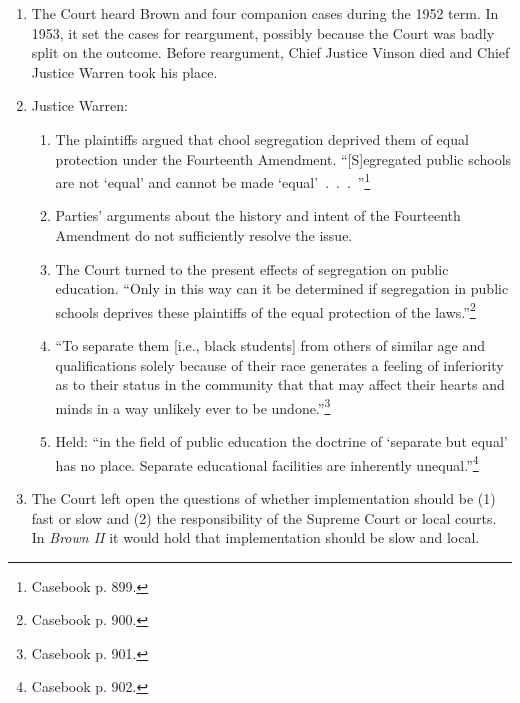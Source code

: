\begin{enumerate}
    \item The Court heard Brown and four companion cases during the 1952 term. 
    In 1953, it set the cases for reargument, possibly because the Court was 
    badly split on the outcome. Before reargument, Chief Justice Vinson died 
    and Chief Justice Warren took his place.
    \item Justice Warren:
    \begin{enumerate}
        \item The plaintiffs argued that chool segregation deprived them of 
        equal protection under the Fourteenth Amendment. ``[S]egregated public
        schools are not `equal' and cannot be made 
        `equal'~.~.~.~''\footnote{Casebook p. 899.}
        \item Parties' arguments about the history and intent of the 
        Fourteenth Amendment do not sufficiently resolve the issue.
        \item The Court turned to the present effects of segregation on public 
        education. ``Only in this way can it be determined if segregation in 
        public schools deprives these plaintiffs of the equal protection of 
        the laws.''\footnote{Casebook p. 900.}
        \item ``To separate them [i.e., black students] from others of similar 
        age and qualifications solely because of their race generates a 
        feeling of inferiority as to their status in the community that that 
        may affect their hearts and minds in a way unlikely ever to be 
        undone.''\footnote{Casebook p. 901.}
        \item Held: ``in the field of public education the doctrine of 
        `separate but equal' has no place. Separate educational facilities are 
        inherently unequal.''\footnote{Casebook p. 902.}
    \end{enumerate}
    \item The Court left open the questions of whether implementation should 
    be (1) fast or slow and (2) the responsibility of the Supreme Court or 
    local courts. In \emph{Brown II} it would hold that implementation should 
    be slow and local.
\end{enumerate}

